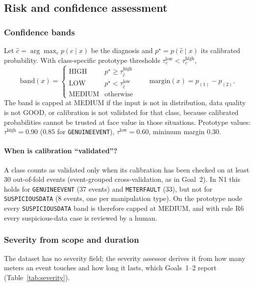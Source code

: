 \documentclass[11pt,a4paper]{article}
\renewcommand{\_}{\textunderscore\allowbreak}
\providecommand{\GE}{\texttt{GENUINE\_EVENT}}
\providecommand{\MF}{\texttt{METER\_FAULT}}
\providecommand{\SD}{\texttt{SUSPICIOUS\_DATA}}
\begin{document}
\subsection{Risk and confidence assessment}
\label{sec:risk}

\subsubsection{Confidence bands}
Let $\hat c=\arg\max_c p(c\mid x)$ be the diagnosis and $p^\star=p(\hat c\mid x)$ its calibrated probability.
With class-specific prototype thresholds $\tau^{\mathrm{low}}_c<\tau^{\mathrm{high}}_c$,
\begin{equation}
\mathrm{band}(x)=\begin{cases}\text{HIGH} & p^\star\ge\tau^{\mathrm{high}}_{\hat c}\\ \text{LOW} & p^\star<\tau^{\mathrm{low}}_{\hat c}\\ \text{MEDIUM} & \text{otherwise}\end{cases}
\qquad \mathrm{margin}(x)=p_{(1)}-p_{(2)} .
\end{equation}
The band is capped at MEDIUM if the input is not in distribution, data quality is not GOOD, or calibration is
not validated for that class, because calibrated probabilities cannot be trusted at face value in those
situations. Prototype values: $\tau^{\mathrm{high}}=0.90$ ($0.85$ for \GE), $\tau^{\mathrm{low}}=0.60$, minimum
margin $0.30$.

\paragraph{When is calibration ``validated''?} A class counts as validated only when its calibration has been
checked on at least 30 out-of-fold events (event-grouped cross-validation, as in Goal~2). In N1 this holds for
\GE{} (37 events) and \MF{} (33), but not for \SD{} (8 events, one per manipulation type). On the prototype node
every \SD{} band is therefore capped at MEDIUM, and with rule R6 every suspicious-data case is reviewed by a
human.

\subsubsection{Severity from scope and duration}
The dataset has no severity field; the severity assessor derives it from how many meters an event touches and
how long it lasts, which Goals~1--2 report (Table~\ref{tab:severity}).
\end{document}
